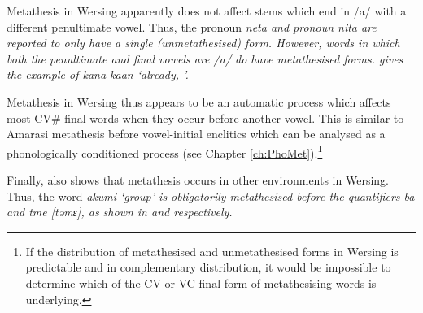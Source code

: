 Metathesis in Wersing apparently does not affect stems
which end in /a/ with a different penultimate vowel.
Thus, the  pronoun \it{neta}
and \tsc{1px} pronoun \it{nita} are reported to only
have a single (unmetathesised) form.
However, words in which both the penultimate and final
vowels are /a/ do have metathesised forms.
\cite{ba18} gives the example of \it{kana} {\ra} \it{kaan} `already, '.

Metathesis in Wersing thus appears to be an automatic
process which affects most CV{\#} final words
when they occur before another vowel.
This is similar to Amarasi metathesis before vowel-initial enclitics
which can be analysed as a phonologically
conditioned process (see Chapter \ref{ch:PhoMet}).\footnote{
		If the distribution of metathesised and unmetathesised
		forms in Wersing is predictable and in complementary distribution,
		it would be impossible to determine which of the CV or VC
		final form of metathesising words is underlying.}

Finally, \cite{ba18} also shows that metathesis
occurs in other environments in Wersing.
Thus, the word \it{akumi} `group' 
is obligatorily metathesised before the quantifiers \it{ba} and \it{tme} [təmɛ],
as shown in  and  respectively.

\begin{multicols}{2}
\let\eachwordone=\itshape
	\begin{exe}
		\label{ex:akuim1}
	\end{exe}
\end{multicols}
\begin{multicols}{2}
\let\eachwordone=\itshape
	\begin{exe}		
		\label{ex:akuim2}
	\end{exe}
\end{multicols}

